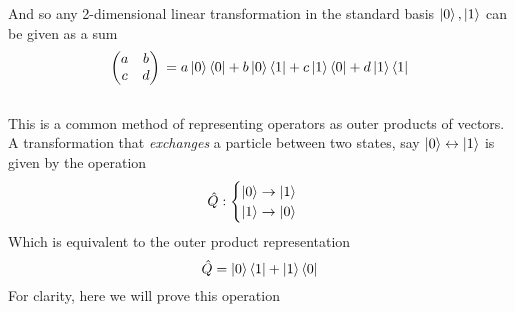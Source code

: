 And so any 2-dimensional linear transformation in the standard basis $\ket{0}, \ket{1}$ can be given as a sum
\begin{equation}
\begin{pmatrix}
  a & b  \\
  c & d 
  \end{pmatrix} \\
= a \ket{0} \langle 0| + b \ket{0} \bra{1} + c \ket{1} \bra{0} + d\ket{1} \bra{1}
\end{equation}
\\
This is a common method of representing operators as outer products of vectors.
A transformation that \emph{exchanges} a particle between two states, say $\ket{0} \leftrightarrow \ket{1}$ is given by the operation 
$$ \hat{Q}: \begin{cases} \ket{0} \rightarrow \ket{1} \\ \ket{1} \rightarrow \ket{0} \end{cases} $$
Which is equivalent to the outer product representation
$$ \hat{Q} = \ket{0} \bra{1} + \ket{1} \langle0| $$
For clarity, here we will prove this operation


